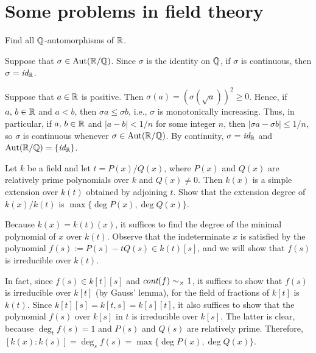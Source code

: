 \section{Some problems in field theory}

\begin{prob}
    Find all ${\mathbb{Q}}$-automorphisms of ${\mathbb{R}}$.
\end{prob}
\begin{sol}
    Suppose that $\sigma\in{\textrm{Aut}({{\mathbb{R}}/{\mathbb{Q}}})}$.
    Since $\sigma$ is the identity on ${\mathbb{Q}}$, if $\sigma$ is continuous, then $\sigma=\textit{id}_{{\mathbb{R}}}$.

    Suppose that $a\in{\mathbb{R}}$ is positive.
    Then $\sigma(a)=(\sigma(\sqrt{a}))^2\geq 0$.
    Hence, if $a,\, b\in{\mathbb{R}}$ and $a<b$, then $\sigma a\leq\sigma b$, i.e., $\sigma$ is monotonically increasing.
    Thus, in particular, if $a,\, b\in{\mathbb{R}}$ and $|a-b|<1/n$ for some integer $n$, then $|\sigma a-\sigma b|\leq 1/n$, so $\sigma$ is continuous whenever $\sigma\in{\textrm{Aut}({{\mathbb{R}}/{\mathbb{Q}}})}$.
    By continuity, $\sigma=\textit{id}_{{\mathbb{R}}}$ and ${\textrm{Aut}({{\mathbb{R}}/{\mathbb{Q}}})}=\{\textit{id}_{{\mathbb{R}}}\}$.
\end{sol}

\begin{prob}\label{degree over the field with a rational}
    Let $k$ be a field and let $t=P(x)/Q(x)$, where $P(x)$ and $Q(x)$ are relatively prime polynomials over $k$ and $Q(x)\neq 0$.
    Then $k(x)$ is a simple extension over $k(t)$ obtained by adjoining $t$.
    Show that the extension degree of $k(x)/k(t)$ is $\max\{\deg P(x), \deg Q(x)\}$.
\end{prob}
\begin{sol}
    Because $k(x)=k(t)(x)$, it suffices to find the degree of the minimal polynomial of $x$ over $k(t)$.
    Observe that the indeterminate $x$ is satisfied by the polynomial $f(s):=P(s)-t Q(s)\in k(t)[s]$, and we will show that $f(s)$ is irreducible over $k(t)$.

    In fact, since $f(s)\in k[t][s]$ and $\textit{cont}(f)\sim_\times 1$, it suffices to show that $f(s)$ is irreducible over $k[t]$ (by Gauss' lemma), for the field of fractions of $k[t]$ is $k(t)$.
    Since $k[t][s]=k[t, s]=k[s][t]$, it also suffices to show that the polynomial $f(s)$ over $k[s]$ in $t$ is irreducible over $k[s]$.
    The latter is clear, because $\deg_t f(s)=1$ and $P(s)$ and $Q(s)$ are relatively prime.
    Therefore, $[k(x): k(s)]=\deg_s f(s)=\max\{\deg P(x), \deg Q(x)\}$.
\end{sol}

